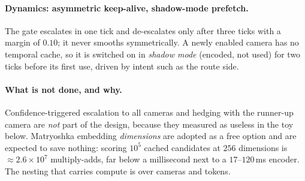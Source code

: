 \paragraph{Dynamics: asymmetric keep-alive, shadow-mode prefetch.}
The gate escalates in one tick and de-escalates only after three ticks with a margin of $0.10$; it never smooths symmetrically. A newly enabled camera has no temporal cache, so it is switched on in \emph{shadow mode} (encoded, not used) for two ticks before its first use, driven by intent such as the route side.

\paragraph{What is not done, and why.}
Confidence-triggered escalation to all cameras and hedging with the runner-up camera are \emph{not} part of the design, because they measured as useless in the toy below. Matryoshka embedding \emph{dimensions} are adopted as a free option and are expected to save nothing: scoring $10^5$ cached candidates at $256$ dimensions is $\approx2.6\times10^7$ multiply-adds, far below a millisecond next to a $17$--$120$\,ms encoder. The nesting that carries compute is over cameras and tokens.

